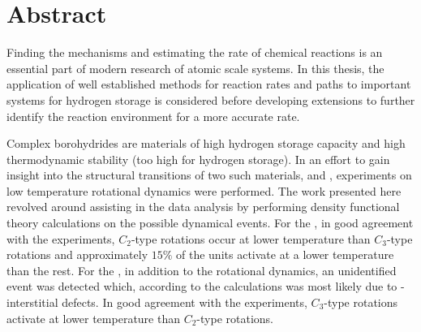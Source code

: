 \chapter*{Abstract}

Finding the mechanisms and estimating the rate of chemical reactions is an essential part of modern research of atomic scale systems.
In this thesis, the application of well established methods for reaction rates and paths to important systems for hydrogen storage is considered before developing extensions to further identify the reaction environment for a more accurate rate.

Complex borohydrides are materials of high hydrogen storage capacity and high thermodynamic stability (too high for hydrogen storage).
In an effort to gain insight into the structural transitions of two such materials,  and , experiments on low temperature rotational dynamics were performed.
The work presented here revolved around assisting in the data analysis by performing density functional theory calculations on the possible dynamical events.
For the , in good agreement with the experiments, $C_2$-type rotations occur at lower temperature than $C_3$-type rotations and approximately $15\%$ of the  units activate at a lower temperature than the rest.
For the , in addition to the rotational dynamics, an unidentified event was detected which, according to the calculations was most likely due to -interstitial defects.
In good agreement with the experiments, $C_3$-type rotations activate at lower temperature than $C_2$-type rotations.

